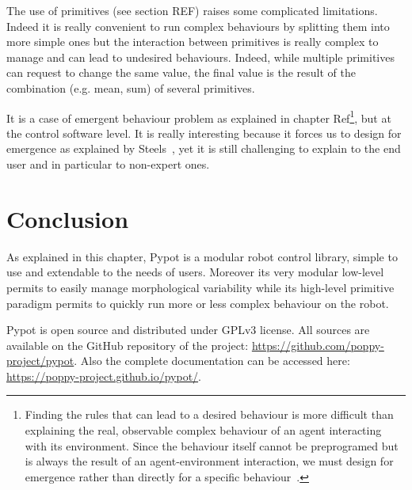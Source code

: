 The use of primitives (see section REF) raises some complicated limitations. Indeed it is really convenient to run complex behaviours by splitting them into more simple ones but the interaction between primitives is really complex to manage and can lead to undesired behaviours. Indeed, while multiple primitives can request to change the same value, the final value is the result of the combination (e.g. mean, sum) of several primitives.

It is a case of emergent behaviour problem as explained in chapter Ref\footnote{Finding the rules that can lead to a desired behaviour is more difficult than explaining the real, observable complex behaviour of an agent interacting with its environment. Since the behaviour itself cannot be preprogramed but is always the result of an agent-environment interaction, we must design for emergence rather than directly for a specific behaviour~\cite{Pfeifer06}.}, but at the control software level. It is really interesting because it forces us to design  for emergence as explained by Steels~\cite{Steels1991emergence}, yet it is still challenging to explain to the end user and in particular to non-expert ones.


\section{Conclusion} %

As explained in this chapter, Pypot is a modular robot control library, simple to use and extendable to the needs of users. Moreover its very modular low-level permits to easily manage morphological variability while its high-level primitive paradigm permits to quickly run more or less complex behaviour on the robot.

Pypot is open source and distributed under GPLv3 license. All sources are available on the GitHub repository of the project: \url{https://github.com/poppy-project/pypot}. Also the complete documentation can be accessed here: \url{https://poppy-project.github.io/pypot/}.





% 



